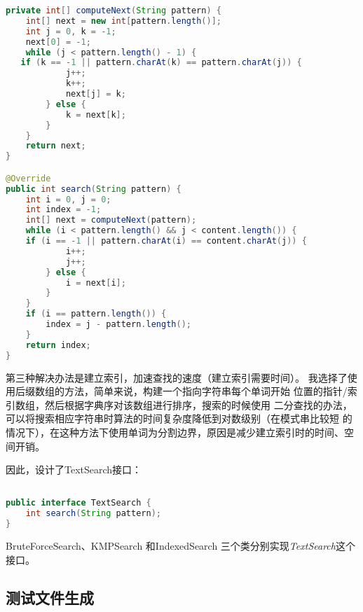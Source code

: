 \documentclass[12pt,a4paper]{ctexart}
\begin{document}
\begin{lstlisting}[basicstyle=\ttfamily,caption=text-indexing/KMPSearch.java.java,language=java,showstringspaces=false]
private int[] computeNext(String pattern) {
    int[] next = new int[pattern.length()];
    int j = 0, k = -1;
    next[0] = -1;
    while (j < pattern.length() - 1) {
   if (k == -1 || pattern.charAt(k) == pattern.charAt(j)) {
            j++;
            k++;
            next[j] = k;
        } else {
            k = next[k];
        }
    }
    return next;
}

@Override
public int search(String pattern) {
    int i = 0, j = 0;
    int index = -1;
    int[] next = computeNext(pattern);
    while (i < pattern.length() && j < content.length()) {
    if (i == -1 || pattern.charAt(i) == content.charAt(j)) {
            i++;
            j++;
        } else {
            i = next[i];
        }
    }
    if (i == pattern.length()) {
        index = j - pattern.length();
    }
    return index;
}
\end{lstlisting}


第三种解决办法是建立索引，加速查找的速度（建立索引需要时间）。
我选择了使用后缀数组的方法，简单来说，构建一个指向字符串每个单词开始
位置的指针/索引数组，然后根据字典序对该数组进行排序，搜索的时候使用
二分查找的办法，可以将搜索相应字符串时算法的时间复杂度降低到对数级别（在模式串比较短
的情况下），在这种方法下使用单词为分割边界，原因是减少建立索引时的时间、空间开销。

因此，设计了TextSearch接口：
\begin{lstlisting}[basicstyle=\ttfamily,caption=text-indexing/TextSearch.java.java,language=java,showstringspaces=false]

public interface TextSearch {
    int search(String pattern);
}
\end{lstlisting}

BruteForceSearch、KMPSearch
和IndexedSearch
三个类分别实现\textit{TextSearch}这个接口。

\subsection{测试文件生成}
\end{document}

